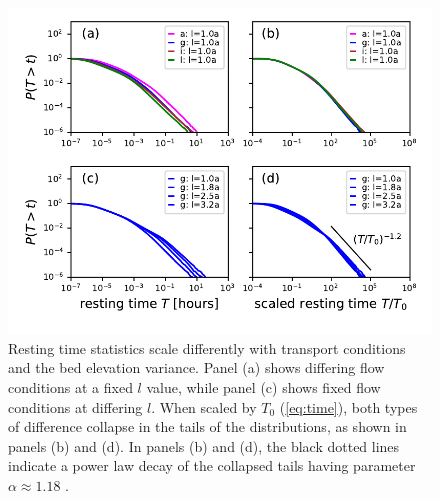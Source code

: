 \begin{figure}[!htbp]
	\includegraphics[width=\linewidth,keepaspectratio]{./figures/ch3/rtcdf.pdf}
	\caption{Resting time statistics scale differently with transport conditions and the bed elevation variance. Panel (a) shows differing flow conditions at a fixed $l$ value, while panel (c) shows fixed flow conditions at differing $l$. When scaled by $T_0$ (\ref{eq:time}), both types of difference collapse in the tails of the distributions, as shown in panels (b) and (d). In panels (b) and (d), the black dotted lines indicate a power law decay of the collapsed tails having parameter $\alpha\approx1.18$ .}
	\label{fig:cdfs}
\end{figure}

